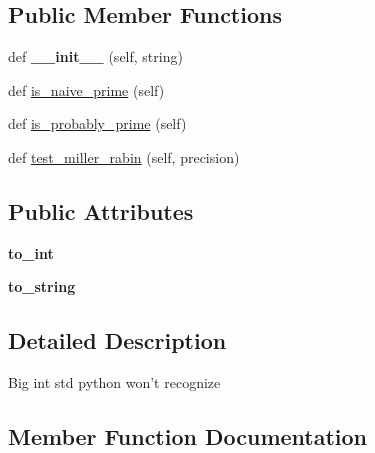 \subsection*{Public Member Functions}
\begin{DoxyCompactItemize}
\item 
def {\bfseries \+\_\+\+\_\+init\+\_\+\+\_\+} (self, string)\hypertarget{classhal_1_1maths_1_1maths_1_1_integer_ab02daf8f7df66b9739514805740d2e29}{}\label{classhal_1_1maths_1_1maths_1_1_integer_ab02daf8f7df66b9739514805740d2e29}

\item 
def \hyperlink{classhal_1_1maths_1_1maths_1_1_integer_a5833e790dc98122d0e5d0e92fb5bee49}{is\+\_\+naive\+\_\+prime} (self)
\item 
def \hyperlink{classhal_1_1maths_1_1maths_1_1_integer_a813e392f81a6c01f87a9ef8d1c8c1250}{is\+\_\+probably\+\_\+prime} (self)
\item 
def \hyperlink{classhal_1_1maths_1_1maths_1_1_integer_a3cd7d69cc1e8bb8271e61bbeba6d2a50}{test\+\_\+miller\+\_\+rabin} (self, precision)
\end{DoxyCompactItemize}
\subsection*{Public Attributes}
\begin{DoxyCompactItemize}
\item 
{\bfseries to\+\_\+int}\hypertarget{classhal_1_1maths_1_1maths_1_1_integer_aef52e227e80e9dc90779d0d8f202dbc6}{}\label{classhal_1_1maths_1_1maths_1_1_integer_aef52e227e80e9dc90779d0d8f202dbc6}

\item 
{\bfseries to\+\_\+string}\hypertarget{classhal_1_1maths_1_1maths_1_1_integer_a18958bf743811b233e9524cbaf355138}{}\label{classhal_1_1maths_1_1maths_1_1_integer_a18958bf743811b233e9524cbaf355138}

\end{DoxyCompactItemize}


\subsection{Detailed Description}
\begin{DoxyVerb}Big int std python won't recognize \end{DoxyVerb}
 

\subsection{Member Function Documentation}
